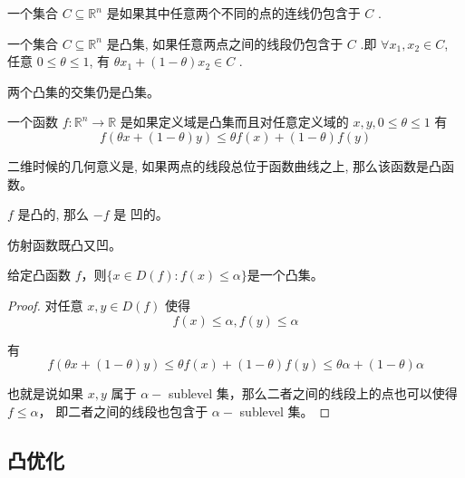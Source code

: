 \begin{definition}[仿射集]
    一个集合 $ C \subseteq \mathbb{R}^{n} $ 是如果其中任意两个不同的点的连线仍包含于 $ C $ .
\end{definition}

\begin{definition}[凸集]
    一个集合 $ C \subseteq \mathbb{R}^{n} $ 是凸集, 如果任意两点之间的线段仍包含于 $ C $ .即 $ \forall x_{1}, x_{2} \in C $, 任意 $ 0 \leqslant \theta \leqslant 1 $, 有 $ \theta x_{1}+(1-\theta) x_{2} \in C $ .
\end{definition}

\begin{theorem}
    两个凸集的交集仍是凸集。
\end{theorem}

\begin{definition}[凸函数]
    一个函数 $ f: \mathbb{R}^{n} \rightarrow \mathbb{R} $ 是如果定义域是凸集而且对任意定义域的 $ x, y, 0 \leqslant \theta \leqslant 1 $ 有
$$
f(\theta x+(1-\theta) y) \leqslant \theta f(x)+(1-\theta) f(y)
$$
\end{definition}

二维时候的几何意义是, 如果两点的线段总位于函数曲线之上, 那么该函数是凸函数。

\begin{theorem}
    $ f $ 是凸的, 那么 $ -f $ 是 凹的。
\end{theorem}

\begin{theorem}
    
仿射函数既凸又凹。
\end{theorem}


\begin{theorem}
    给定凸函数 $ f$，则$\{x \in D(f): f(x) \leqslant \alpha\} $是一个凸集。
\end{theorem}

\begin{proof}
    对任意 $ x, y \in D(f) $ 使得 $$ f(x) \leqslant \alpha, f(y) \leqslant \alpha $$
    
    有 $$ f(\theta x+(1-\theta) y) \leqslant \theta f(x)+(1-\theta) f(y) \leqslant \theta \alpha+(1-\theta) \alpha $$
    
    也就是说如果 $ x, y $ 属于 $ \alpha- $ sublevel 集，那么二者之间的线段上的点也可以使得 $ f \leqslant \alpha ， $ 即二者之间的线段也包含于 $ \alpha- $ sublevel 集。
\end{proof}

\subsection{凸优化}

